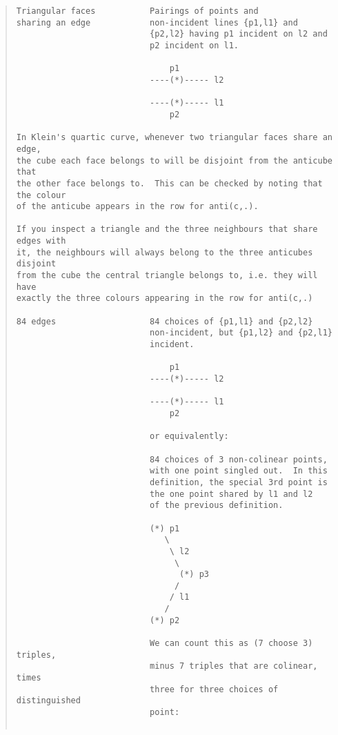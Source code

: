 \begin{quote}
\begin{verbatim}
Triangular faces           Pairings of points and
sharing an edge            non-incident lines {p1,l1} and
                           {p2,l2} having p1 incident on l2 and
                           p2 incident on l1.

                               p1
                           ----(*)----- l2

                           ----(*)----- l1
                               p2

In Klein's quartic curve, whenever two triangular faces share an edge, 
the cube each face belongs to will be disjoint from the anticube that 
the other face belongs to.  This can be checked by noting that the colour 
of the anticube appears in the row for anti(c,.).

If you inspect a triangle and the three neighbours that share edges with 
it, the neighbours will always belong to the three anticubes disjoint 
from the cube the central triangle belongs to, i.e. they will have 
exactly the three colours appearing in the row for anti(c,.)

84 edges                   84 choices of {p1,l1} and {p2,l2}
                           non-incident, but {p1,l2} and {p2,l1}
                           incident.

                               p1
                           ----(*)----- l2

                           ----(*)----- l1
                               p2

                           or equivalently:

                           84 choices of 3 non-colinear points,
                           with one point singled out.  In this
                           definition, the special 3rd point is
                           the one point shared by l1 and l2
                           of the previous definition.

                           (*) p1
                              \
                               \ l2
                                \
                                 (*) p3
                                /
                               / l1
                              /
                           (*) p2

                           We can count this as (7 choose 3) triples,
                           minus 7 triples that are colinear, times
                           three for three choices of distinguished
                           point:


\end{verbatim}
\end{quote}

